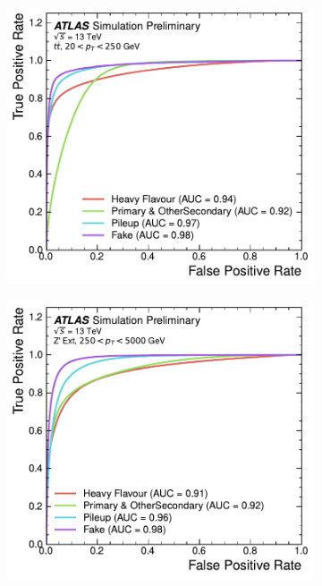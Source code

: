 \begin{figure}[!htbp]
    \centering
    \begin{subfigure}[b]{0.48\textwidth}
        \centering
        \includegraphics[width=\textwidth]{chapters/gnn_tagger/figs/results/tracks/ttbar/ttbar_origin_roc_GNNv11.pdf}
    \end{subfigure}
    \quad
    \begin{subfigure}[b]{0.48\textwidth}
        \centering
        \includegraphics[width=\textwidth]{chapters/gnn_tagger/figs/results/tracks/zprime/zprime_origin_roc_GNNv11.pdf}

\end{subfigure}
\end{figure}

